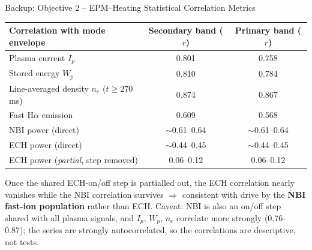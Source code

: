 \documentclass[aspectratio=169,xcolor=table]{beamer}
\begin{document}
\begin{frame}{Backup: Objective 2 -- EPM--Heating Statistical Correlation Metrics}
    \small
    \begin{center}
    \begin{tabular}{lcc}
        \toprule
        Correlation with mode envelope & Secondary band ($r$) & Primary band ($r$) \\
        \midrule
        Plasma current $I_p$        & 0.801 & 0.758 \\
        Stored energy $W_p$         & 0.810 & 0.784 \\
        Line-averaged density $n_e$ ($t\ge270$\,ms) & 0.874 & 0.867 \\
        Fast H$\alpha$ emission     & 0.609 & 0.568 \\
        \midrule
        NBI power (direct)          & $\sim$0.61--0.64 & $\sim$0.61--0.64 \\
        ECH power (direct)          & $\sim$0.44--0.45 & $\sim$0.44--0.45 \\
        ECH power (\emph{partial}, step removed) & 0.06--0.12 & 0.06--0.12 \\
        \bottomrule
    \end{tabular}
    \end{center}
    \vspace{0.3cm}
    \normalsize
    Once the shared ECH-on/off step is partialled out, the ECH correlation nearly
    vanishes while the NBI correlation survives $\Rightarrow$ consistent with
    drive by the \textbf{NBI fast-ion population} rather than ECH. Caveat: NBI
    is also an on/off step shared with all plasma signals, and $I_p$, $W_p$,
    $n_e$ correlate more strongly (0.76--0.87); the series are strongly
    autocorrelated, so the correlations are descriptive, not tests.
\end{frame}
\end{document}
